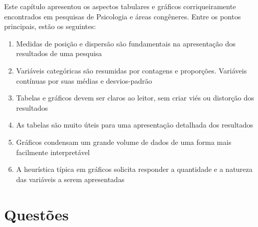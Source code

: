\documentclass[
]{book}
\providecommand{\tightlist}{%
  \setlength{\itemsep}{0pt}\setlength{\parskip}{0pt}}
\newenvironment{explore}{
  \definecolor{shadecolor}{rgb}{0, 0, 0}  %
  \color{white}
  \begin{shaded}}
 {\end{shaded}}
\begin{document}
\begin{explore}

Este capítulo apresentou os aspectos tabulares e gráficos corriqueiramente encontrados em pesquisas de Psicologia e áreas congêneres. Entre os pontos principais, estão os seguintes:

\begin{enumerate}
\def\labelenumi{\arabic{enumi}.}
\tightlist
\item
  Medidas de posição e dispersão são fundamentais na apresentação dos resultados de uma pesquisa\\
\item
  Variáveis categóricas são resumidas por contagens e proporções. Variáveis contínuas por suas médias e desvios-padrão\\
\item
  Tabelas e gráficos devem ser claros ao leitor, sem criar viés ou distorção dos resultados\\
\item
  As tabelas são muito úteis para uma apresentação detalhada dos resultados\\
\item
  Gráficos condensam um grande volume de dados de uma forma mais facilmente interpretável\\
\item
  A heurística típica em gráficos solicita responder a quantidade e a natureza das variáveis a serem apresentadas\\
\end{enumerate}

\end{explore}

\hypertarget{questuxf5es-1}{%
\section{Questões}\label{questuxf5es-1}}
\end{document}
